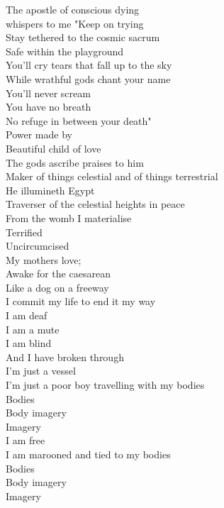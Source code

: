 
The apostle of conscious dying\\
whispers to me "Keep on trying\\
Stay tethered to the cosmic sacrum\\
Safe within the  playground\\
You'll cry tears that fall up to the sky\\
While wrathful gods chant your name\\
You'll never scream\\
You have no breath\\
No refuge in between your death"\\

Power made by \\
Beautiful child of love\\
The gods ascribe praises to him\\
Maker of things celestial and of things terrestrial\\
He illumineth Egypt\\
Traverser of the celestial heights in peace\\

From the womb I materialise\\
Terrified\\
Uncircumcised\\
My mothers love; \\
Awake for the caesarean\\
Like a dog on a freeway\\
I commit my life to end it my way\\
I am deaf\\
I am a mute\\
I am blind\\
And I have broken through\\

I'm just a vessel\\
I'm just a poor boy travelling with my bodies\\
Bodies\\
Body imagery\\
Imagery\\
I am free\\
I am marooned and tied to my bodies\\
Bodies\\
Body imagery\\
Imagery\\

